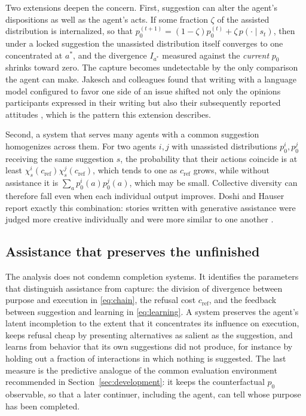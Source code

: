 Two extensions deepen the concern. First, suggestion can alter the agent's dispositions as well as the agent's acts. If some fraction $\zeta$ of the assisted distribution is internalized, so that $p_0^{(t+1)}=(1-\zeta)p_0^{(t)}+\zeta\,p(\cdot\mid s_t)$, then under a locked suggestion the unassisted distribution itself converges to one concentrated at $a^\ast$, and the divergence $I_{a^\ast}$ measured against the \emph{current} $p_0$ shrinks toward zero. The capture becomes undetectable by the only comparison the agent can make. Jakesch and colleagues found that writing with a language model configured to favor one side of an issue shifted not only the opinions participants expressed in their writing but also their subsequently reported attitudes \cite{jakesch2023}, which is the pattern this extension describes.

Second, a system that serves many agents with a common suggestion homogenizes across them. For two agents $i,j$ with unassisted distributions $p_0^i,p_0^j$ receiving the same suggestion $s$, the probability that their actions coincide is at least $\chi^i_s(c_{\mathrm{ref}})\chi^j_s(c_{\mathrm{ref}})$, which tends to one as $c_{\mathrm{ref}}$ grows, while without assistance it is $\sum_ap_0^i(a)p_0^j(a)$, which may be small. Collective diversity can therefore fall even when each individual output improves. Doshi and Hauser report exactly this combination: stories written with generative assistance were judged more creative individually and were more similar to one another \cite{doshihauser2024}.

\subsection{Assistance that preserves the unfinished}

The analysis does not condemn completion systems. It identifies the parameters that distinguish assistance from capture: the division of divergence between purpose and execution in \eqref{eq:chain}, the refusal cost $c_{\mathrm{ref}}$, and the feedback between suggestion and learning in \eqref{eq:learning}. A system preserves the agent's latent incompletion to the extent that it concentrates its influence on execution, keeps refusal cheap by presenting alternatives as salient as the suggestion, and learns from behavior that its own suggestions did not produce, for instance by holding out a fraction of interactions in which nothing is suggested. The last measure is the predictive analogue of the common evaluation environment recommended in Section~\ref{sec:development}: it keeps the counterfactual $p_0$ observable, so that a later continuer, including the agent, can tell whose purpose has been completed.

